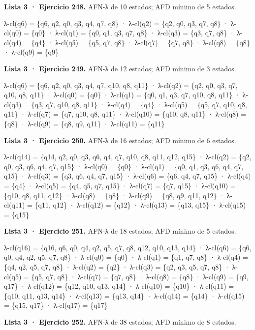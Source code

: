 \textbf{Lista 3 · Ejercicio 248.} AFN-λ de 10 estados; AFD mínimo de 5 estados.

λ-cl(q6) = \{q6, q2, q0, q3, q4, q7, q8\} · λ-cl(q2) = \{q2, q0, q3, q7, q8\} · λ-cl(q0) = \{q0\} · λ-cl(q1) = \{q0, q1, q3, q7, q8\} · λ-cl(q3) = \{q3, q7, q8\} · λ-cl(q4) = \{q4\} · λ-cl(q5) = \{q5, q7, q8\} · λ-cl(q7) = \{q7, q8\} · λ-cl(q8) = \{q8\} · λ-cl(q9) = \{q9\}

\textbf{Lista 3 · Ejercicio 249.} AFN-λ de 12 estados; AFD mínimo de 3 estados.

λ-cl(q6) = \{q6, q2, q0, q3, q4, q7, q10, q8, q11\} · λ-cl(q2) = \{q2, q0, q3, q7, q10, q8, q11\} · λ-cl(q0) = \{q0\} · λ-cl(q1) = \{q0, q1, q3, q7, q10, q8, q11\} · λ-cl(q3) = \{q3, q7, q10, q8, q11\} · λ-cl(q4) = \{q4\} · λ-cl(q5) = \{q5, q7, q10, q8, q11\} · λ-cl(q7) = \{q7, q10, q8, q11\} · λ-cl(q10) = \{q10, q8, q11\} · λ-cl(q8) = \{q8\} · λ-cl(q9) = \{q8, q9, q11\} · λ-cl(q11) = \{q11\}

\textbf{Lista 3 · Ejercicio 250.} AFN-λ de 16 estados; AFD mínimo de 6 estados.

λ-cl(q14) = \{q14, q2, q0, q3, q6, q4, q7, q10, q8, q11, q12, q15\} · λ-cl(q2) = \{q2, q0, q3, q6, q4, q7, q15\} · λ-cl(q0) = \{q0\} · λ-cl(q1) = \{q0, q1, q3, q6, q4, q7, q15\} · λ-cl(q3) = \{q3, q6, q4, q7, q15\} · λ-cl(q6) = \{q6, q4, q7, q15\} · λ-cl(q4) = \{q4\} · λ-cl(q5) = \{q4, q5, q7, q15\} · λ-cl(q7) = \{q7, q15\} · λ-cl(q10) = \{q10, q8, q11, q12\} · λ-cl(q8) = \{q8\} · λ-cl(q9) = \{q8, q9, q11, q12\} · λ-cl(q11) = \{q11, q12\} · λ-cl(q12) = \{q12\} · λ-cl(q13) = \{q13, q15\} · λ-cl(q15) = \{q15\}

\textbf{Lista 3 · Ejercicio 251.} AFN-λ de 18 estados; AFD mínimo de 5 estados.

λ-cl(q16) = \{q16, q6, q0, q4, q2, q5, q7, q8, q12, q10, q13, q14\} · λ-cl(q6) = \{q6, q0, q4, q2, q5, q7, q8\} · λ-cl(q0) = \{q0\} · λ-cl(q1) = \{q1, q7, q8\} · λ-cl(q4) = \{q4, q2, q5, q7, q8\} · λ-cl(q2) = \{q2\} · λ-cl(q3) = \{q2, q3, q5, q7, q8\} · λ-cl(q5) = \{q5, q7, q8\} · λ-cl(q7) = \{q7, q8\} · λ-cl(q8) = \{q8\} · λ-cl(q9) = \{q9, q17\} · λ-cl(q12) = \{q12, q10, q13, q14\} · λ-cl(q10) = \{q10\} · λ-cl(q11) = \{q10, q11, q13, q14\} · λ-cl(q13) = \{q13, q14\} · λ-cl(q14) = \{q14\} · λ-cl(q15) = \{q15, q17\} · λ-cl(q17) = \{q17\}

\textbf{Lista 3 · Ejercicio 252.} AFN-λ de 38 estados; AFD mínimo de 8 estados.

